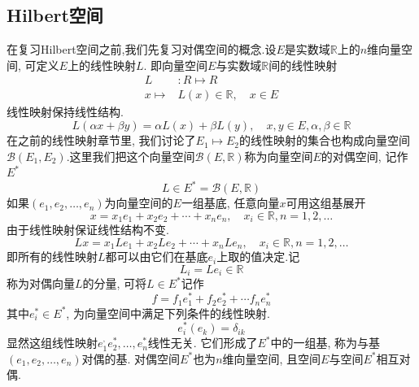 \documentclass[a4paper,11pt]{article}
\theoremstyle{mystyle}
\begin{document}
\subsection{Hilbert空间}\label{Hilbert Space}
在复习Hilbert空间之前,我们先复习对偶空间的概念.设$E$是实数域$\mathbb{R}$上的$n$维向量空间, 可定义$E$上的线性映射$L$. 即向量空间$E$与实数域$\mathbb{R}$间的线性映射
\begin{equation*}
\begin{split}
   L&:R\mapsto R \\
     x\mapsto&L(x)\in \mathbb{R},\quad x\in E
\end{split}
\end{equation*}
线性映射保持线性结构.
\begin{equation*}
  L(\alpha x+\beta y)=\alpha L(x)+\beta L(y),\quad x,y\in E,\alpha,\beta\in\mathbb{R}
\end{equation*}
在之前的线性映射章节里, 我们讨论了$E_1\mapsto E_2$的线性映射的集合也构成向量空间$\mathcal{B}(E_1,E_2)$.这里我们把这个向量空间$\mathcal{B}(E,\mathbb{R})$称为向量空间$E$的对偶空间, 记作$E^*$
\begin{equation*}
  L\in E^*=\mathcal{B}(E,\mathbb{R})
\end{equation*}
如果$(e_1,e_2,\dots,e_n)$为向量空间的$E$一组基底, 任意向量$x$可用这组基展开
\begin{equation*}
  x=x_1e_1+x_2e_2+\cdots+x_ne_n, \quad x_i\in\mathbb{R},n=1,2,\dots
\end{equation*}
由于线性映射保证线性结构不变.
\begin{equation*}
  Lx=x_1Le_1+x_2Le_2+\cdots+x_nLe_n, \quad x_i\in\mathbb{R},n=1,2,\dots
\end{equation*}
即所有的线性映射$L$都可以由它们在基底$e_i$上取的值决定.记
\begin{equation*}
  L_i=Le_i\in\mathbb{R}
\end{equation*}
称为对偶向量$L$的分量, 可将$L\in E^*$记作
\begin{equation*}
  f=f_1e_1^*+f_2e_2^*+\cdots f_ne_n^*
\end{equation*}
其中$e_i^*\in E^*$, 为向量空间中满足下列条件的线性映射.
\begin{equation*}
  e_i^*(e_k)=\delta_{ik}
\end{equation*}
显然这组线性映射$e_1^,e_2^*,\dots,e_n^*$线性无关. 它们形成了$E^*$中的一组基, 称为与基$(e_1,e_2,\dots,e_n)$对偶的基. 对偶空间$E^*$也为$n$维向量空间, 且空间$E$与空间$E^*$相互对偶.
\end{document}
